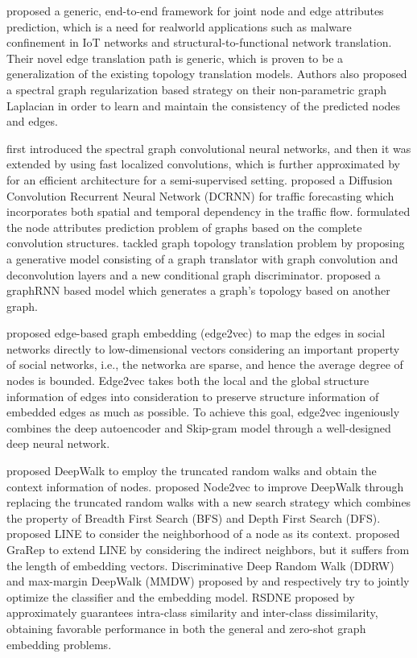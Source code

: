 \citet{guo2019deep} proposed a generic, end-to-end framework for joint node and edge attributes prediction, which is a need for realworld applications such as malware confinement in IoT networks and structural-to-functional network translation. Their novel edge translation path is generic, which is proven to be a generalization of the existing topology translation models. Authors also proposed a spectral graph regularization based strategy on their non-parametric graph Laplacian in order to learn and maintain the consistency of the predicted nodes and edges.

\citet{bruna2014spectral} first introduced the spectral graph convolutional neural networks, and then it was extended by \citet{defferrard2016convolutional} using fast localized convolutions, which is further approximated by \citet{DBLP:conf/iclr/KipfW17} for an efficient architecture for a semi-supervised setting. \citet{li2018diffusion} proposed a Diffusion Convolution Recurrent Neural Network (DCRNN) for traffic forecasting which incorporates both spatial and temporal dependency in the traffic flow. \citet{Yu2018SpatioTemporalGC} formulated the node attributes prediction problem of graphs based on the complete convolution structures. \citet{9737289} tackled graph topology translation problem by proposing a generative model consisting of a graph translator with graph convolution and deconvolution layers and a new conditional graph discriminator. \citet{sun2019graph} proposed a graphRNN based model which generates a graph’s topology based on another graph.

\citet{wang2020edge2vec} proposed edge-based graph embedding (edge2vec) to map the edges in social networks directly to low-dimensional vectors considering an important property of social networks, i.e., the networka are sparse, and hence the average degree of nodes is bounded. Edge2vec takes both the local and the global structure information of edges into consideration to preserve structure information of embedded edges as much as possible. To achieve this goal, edge2vec ingeniously combines the deep autoencoder and Skip-gram model through a well-designed deep neural network.

\citet{perozzi2014deepwalk} proposed DeepWalk to employ the truncated random walks and obtain the context information of nodes. \citet{grover2016node2vec} proposed Node2vec to improve DeepWalk through replacing the truncated random walks with a new search strategy which combines the property of Breadth First Search (BFS) and Depth First Search (DFS). \citet{tang2015line} proposed LINE to consider the neighborhood of a node as its context. \citet{cao2015grarep} proposed GraRep to extend LINE by considering the indirect neighbors, but it suffers from the length of embedding vectors. Discriminative Deep Random Walk (DDRW) and max-margin DeepWalk (MMDW) proposed by \citet{li2016discriminative} and \citet{tu2016max} respectively try to jointly optimize the classifier and the embedding model. RSDNE proposed by \citet{wang2018rsdne} approximately guarantees intra-class similarity and inter-class dissimilarity, obtaining favorable performance in both the general and zero-shot graph embedding problems.

